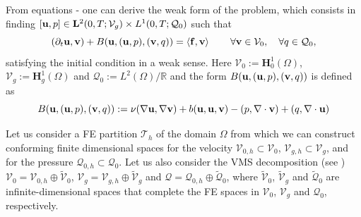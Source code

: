 From equations - one can derive the weak form of the problem, which consists in finding $[{\bf u},p]\in\mathbf{L}^2(0,T;\mathcal{V}_g)\times L^1(0,T;\mathcal{Q}_0)$ such that
\begin{equation}
\label{eq-C8_NS_weak}
(\partial_t{\bf u},{\bf v})+B({\bf u},({\bf u},p),({\bf v},q)) = \left<{\bf f},{\bf v}\right> 
\quad\quad\forall{\bf v}\in\mathcal{V}_0,\quad\forall q\in\mathcal{Q}_0,
\end{equation}
satisfying the initial condition  in a weak sense. Here $\mathcal{V}_0:=\mathbf{H}_0^1(\Omega)$, $\mathcal{V}_g:=\mathbf{H}_g^1(\Omega)$  and $\mathcal{Q}_0:=L^2(\Omega)/\mathbb{R}$ and the form $B({\bf u},({\bf u},p),({\bf v},q))$ is defined as 
\begin{equation}
\label{eq-C8_bilinear}
B({\bf u},({\bf u},p),({\bf v},q)):=\nu(\nabla{\bf u},\nabla{\bf v})+b({\bf u},{\bf u},{\bf v})-(p,\nabla\cdot{\bf v})+(q,\nabla\cdot{\bf u})
\end{equation}

Let us consider a FE partition $\mathcal{T}_h$ of the domain $\Omega$ from which we can construct conforming finite dimensional spaces for the velocity $\mathcal{V}_{0,h} \subset \mathcal{V}_0$, $\mathcal{V}_{g,h} \subset \mathcal{V}_g$, and for the pressure $\mathcal{Q}_{0,h}\subset \mathcal{Q}_0$. Let us also consider the VMS decomposition (see ) $\mathcal{V}_0=\mathcal{V}_{0,h}\oplus\widetilde{\mathcal{V}}_0$, $\mathcal{V}_g=\mathcal{V}_{g,h}\oplus\widetilde{\mathcal{V}}_g$ and $\mathcal{Q}=\mathcal{Q}_{0,h}\oplus\widetilde{\mathcal{Q}}_0$, where $\widetilde{\mathcal{V}}_0$, $\widetilde{\mathcal{V}}_g$ and $\widetilde{\mathcal{Q}}_0$ are infinite-dimensional spaces that complete the FE spaces in $\mathcal{V}_0$, $\mathcal{V}_g$ and $\mathcal{Q}_0$, respectively.

